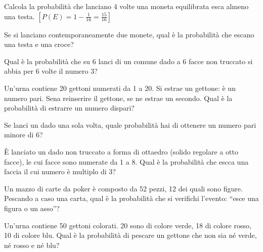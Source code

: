 \begin{esercizio}[\Ast]
 \label{ese:9.46}
Calcola la probabilità che lanciano 4 volte una moneta equilibrata esca almeno 
una testa.
\hfill \(\left[P(E)=1-\frac 1{16}=\frac{15}{16}\right]\)
\end{esercizio}


\begin{esercizio}%
Se si lanciano contemporaneamente due monete, qual è la probabilità che escano 
una testa e una croce?
\end{esercizio}

\begin{esercizio} %
Qual è la probabilità che su 6 lanci di un comune dado a 6 facce non truccato si 
abbia per 6 volte il numero 3?
\end{esercizio}

\begin{esercizio} %
Un'urna contiene 20 gettoni numerati da 1 a 20. Si estrae un gettone: è un 
numero pari. Sena reinserire il gettone, se ne estrae un secondo. Qual è la 
probabilità di estrarre un numero dispari?
\end{esercizio}

\begin{esercizio} %
Se lanci un dado una sola volta, quale probabilità hai di ottenere un numero 
pari minore di 6?
\end{esercizio}

\begin{esercizio} %
È lanciato un dado non truccato a forma di ottaedro (solido regolare a otto 
facce), le cui facce sono numerate da 1 a 8. Qual è la probabilità che escca una 
faccia il cui numero è multiplo di 3?
\end{esercizio}

\begin{esercizio} %
Un mazzo di carte da poker è composto da 52 pezzi, 12 dei quali sono figure. 
Pescando a caso una carta, qual è la probabilità che si verifichi l'evento: 
``esce una figura o un asso''?
\end{esercizio}

\begin{esercizio} %
Un'urna contiene 50 gettoni colorati. 20 sono di colore verde, 18 di colore 
rosso, 10 di colore blu. Qual è la probabilità di pescare un gettone che non sia 
né verde, né rosso e né blu?
\end{esercizio}

